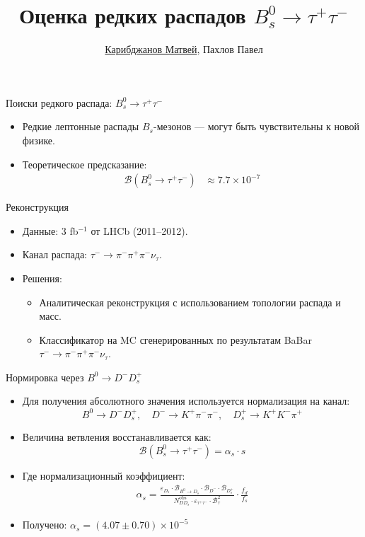 \documentclass[russian]{beamer}
\title{Оценка редких распадов $B^0_{s} \to \tau^+ \tau^-$}
\author[Карибджанов Матвей]{\underline{Карибджанов Матвей}, Пахлов Павел}
\begin{document}
\begin{frame}%
    \titlepage
\end{frame}

\begin{frame}{Поиски редкого распада: $B^0_s \to \tau^+ \tau^-$}
  \begin{itemize}
    \item Редкие лептонные распады $B_s$-мезонов --- могут быть чувствительны к новой физике.
    \item Теоретическое предсказание:
    \begin{align*}
      \mathcal{B}(B^0_s \to \tau^+ \tau^-) &\approx 7.7 \times 10^{-7}
    \end{align*}
  \end{itemize}
\end{frame}

\begin{frame}{Реконструкция}
  \begin{itemize}
    \item Данные: 3 fb$^{-1}$ от LHCb (2011--2012).
    \item Канал распада: $\tau^- \to \pi^- \pi^+ \pi^- \nu_\tau$.
    \item Решения:
    \begin{itemize}
      \item Аналитическая реконструкция с использованием топологии распада и масс.
      \item Классификатор на MC сгенерированных по результатам BaBar $\tau^- \to \pi^- \pi^+ \pi^- \nu_\tau$.
    \end{itemize}
  \end{itemize}
\end{frame}

\begin{frame}{Нормировка через $B^0 \to D^- D^+_s$}
  \begin{itemize}
    \item Для получения абсолютного значения используется нормализация на канал:
    \[ B^0 \to D^- D^+_s,\quad D^- \to K^+ \pi^- \pi^-,\quad D^+_s \to K^+ K^- \pi^+ \]
    \item Величина ветвления восстанавливается как:
    \[ \mathcal{B}(B^0_s \to \tau^+ \tau^-) = \alpha_s \cdot s \]
    \item Где нормализационный коэффициент:
    \begin{align*}
    \alpha_s = \frac{\varepsilon_{D_s} \cdot \mathcal{B}_{B^0 \to D_s} \cdot \mathcal{B}_{D^-} \cdot \mathcal{B}_{D^+_s}}
    {N_{DD_s}^{\text{obs}} \cdot \varepsilon_{\tau^+\tau^-} \cdot \mathcal{B}_{\tau}^2} \cdot \frac{f_d}{f_s}
    \end{align*}
    \item Получено: \( \alpha_s = (4.07 \pm 0.70) \times 10^{-5} \)
  \end{itemize}
\end{frame}
\end{document}
